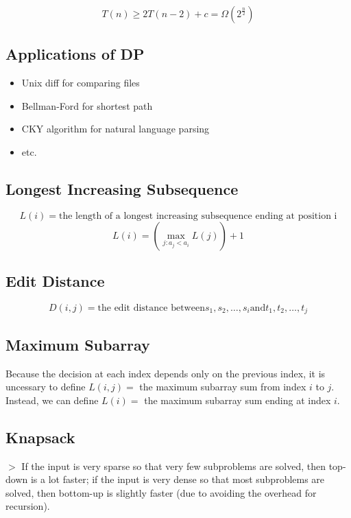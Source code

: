\documentclass[12pt,a4paper]{article}
\newcommand{\remark}[1]{
    {\small $>$ {\color{blue} #1}}
}
\begin{document}
\[T(n) \geq 2T(n-2) + c = \Omega(2^{\frac{n}{2}})\]



\subsection*{Applications of DP}

\begin{itemize}
  \item Unix diff for comparing files
  \item Bellman-Ford for shortest path
  \item CKY algorithm for natural language parsing
  \item etc.
\end{itemize}

\subsection*{Longest Increasing Subsequence}

\[L(i) = \text{the length of a longest increasing subsequence ending at position i}\]
\[L(i) = (\max_{j:a_j < a_i}{L(j)})+1\]

\subsection*{Edit Distance}

\[D(i, j) = \text{the edit distance between} s_1,s_2,\dots,s_i \text{and} t_1,t_2,\dots,t_j\]

\subsection*{Maximum Subarray}

Because the decision at each index depends only on the previous index,
it is uncessary to define $L(i, j) = $ the maximum subarray sum from index $i$ to $j$.
Instead, we can define $L(i) = $ the maximum subarray sum ending at index $i$.

\subsection*{Knapsack}

\remark{If the input is very sparse so that very few subproblems are solved, then top-down is a lot faster; if the input is very dense so that most subproblems are solved, then bottom-up is slightly faster (due to avoiding the overhead for recursion).}
\end{document}
